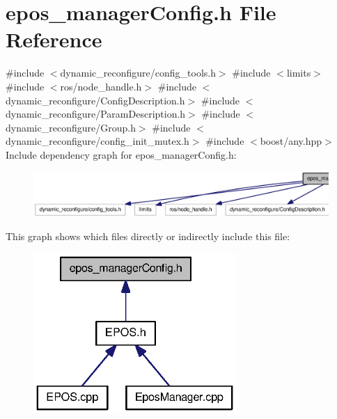 \section{epos\-\_\-manager\-Config.\-h \-File \-Reference}
\label{epos__managerConfig_8h}
{\ttfamily \#include $<$dynamic\-\_\-reconfigure/config\-\_\-tools.\-h$>$}\*
{\ttfamily \#include $<$limits$>$}\*
{\ttfamily \#include $<$ros/node\-\_\-handle.\-h$>$}\*
{\ttfamily \#include $<$dynamic\-\_\-reconfigure/\-Config\-Description.\-h$>$}\*
{\ttfamily \#include $<$dynamic\-\_\-reconfigure/\-Param\-Description.\-h$>$}\*
{\ttfamily \#include $<$dynamic\-\_\-reconfigure/\-Group.\-h$>$}\*
{\ttfamily \#include $<$dynamic\-\_\-reconfigure/config\-\_\-init\-\_\-mutex.\-h$>$}\*
{\ttfamily \#include $<$boost/any.\-hpp$>$}\*
\-Include dependency graph for epos\-\_\-manager\-Config.\-h\-:
\nopagebreak
\begin{figure}[H]
\begin{center}
\leavevmode
\includegraphics[width=350pt]{epos__managerConfig_8h__incl}
\end{center}
\end{figure}
\-This graph shows which files directly or indirectly include this file\-:
\nopagebreak
\begin{figure}[H]
\begin{center}
\leavevmode
\includegraphics[width=218pt]{epos__managerConfig_8h__dep__incl}
\end{center}
\end{figure}
